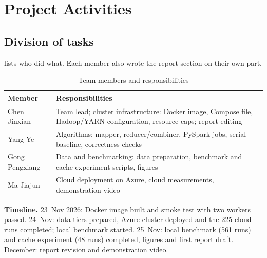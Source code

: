 \section{Project Activities}\label{sec:activities}

\subsection{Division of tasks}
 lists who did what. Each member also wrote the report section on
their own part.

\begin{table}[t]
\centering
\caption{Team members and responsibilities}\label{tab:team}
\begin{tabularx}{\columnwidth}{@{}>{\raggedright\arraybackslash}p{}>{\raggedright\arraybackslash}X@{}}
\toprule
Member & Responsibilities \\
\midrule
Chen Jinxian & Team lead; cluster infrastructure: Docker image, Compose file, Hadoop/YARN configuration, resource caps; report editing \\[2pt]
Yang Ye & Algorithms: mapper, reducer/combiner, PySpark jobs, serial baseline, correctness checks \\[2pt]
Gong Pengxiang & Data and benchmarking: data preparation, benchmark and cache-experiment scripts, figures \\[2pt]
Ma Jiajun & Cloud deployment on Azure, cloud measurements, demonstration video \\
\bottomrule
\end{tabularx}
\end{table}

\textbf{Timeline.} 23~Nov 2026: Docker image built and smoke test with two workers
passed. 24~Nov: data tiers prepared, Azure cluster deployed and the 225 cloud runs
completed; local benchmark started. 25~Nov: local benchmark (561 runs) and cache
experiment (48 runs) completed, figures and first report draft. December: report
revision and demonstration video.


